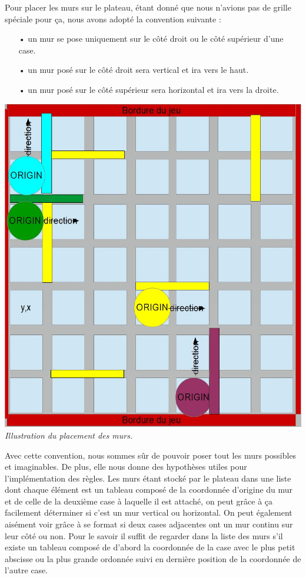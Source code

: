 \documentclass[a4paper, 12pt]{article}
\begin{document}
Pour placer les murs sur le plateau, étant donné que nous n'avions pas de grille spéciale pour ça, nous avons adopté la convention suivante : \\
\begin{itemize}
\item[•] un mur se pose uniquement sur le côté droit ou le côté supérieur d'une case.
\item[•] un mur posé sur le côté droit sera vertical et ira vers le haut.
\item[•] un mur posé sur le côté supérieur sera horizontal et ira vers la droite.
\end{itemize}
\begin{center}
\includegraphics[scale=0.3]{wall.jpg} \\
\textit{Illustration du placement des murs.}
\end{center}
Avec cette convention, nous sommes sûr de pouvoir poser tout les murs possibles et imaginables. De plus, elle nous donne des hypothèses utiles pour l'implémentation des règles. Les murs étant stocké par le plateau dans une liste dont chaque élément est un tableau composé de la coordonnée d'origine du mur et de celle de la deuxième case à laquelle il est attaché, on peut grâce à ça facilement déterminer si c'est un mur vertical ou horizontal. On peut également aisément voir grâce à se format si deux cases adjacentes ont un mur continu sur leur côté ou non. Pour le savoir il suffit de regarder dans la liste des murs s'il existe un tableau composé de d'abord la coordonnée de la case avec le plus petit abscisse ou la plus grande ordonnée suivi en dernière position de la coordonnée de l'autre case.
\end{document}
